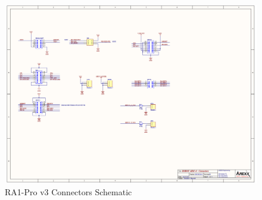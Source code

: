 \documentclass[12p,a4paper]{report}
\begin{document}
\begin{appendices}
\begin{figure}
\includegraphics[scale=0.45]{arm-connectors-schematic}
\caption{RA1-Pro v3 Connectors Schematic \cite{arexx}}
\label{fig:arm-connectors-schematic}
\end{figure}
\end{appendices}



\end{document}
